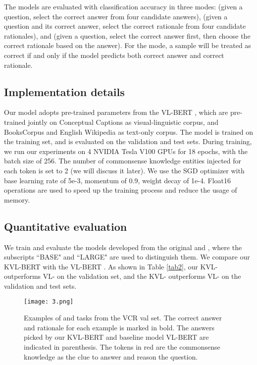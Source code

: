 \documentclass[conference]{IEEEtran}
\begin{document}
The models are evaluated with classification accuracy in three modes:  (given a question, select the correct answer from four candidate answers),  (given a question and its correct answer, select the correct rationale from four candidate rationales), and  (given a question, select the correct answer first, then choose the correct rationale based on the answer). For the  mode, a sample will be treated as correct if and only if the model predicts both correct answer and correct rationale.

\subsection{Implementation details}
Our model adopts pre-trained parameters from the VL-BERT \cite{b14}, which are pre-trained jointly on Conceptual Captions \cite{b41} as visual-linguistic corpus, and BooksCorpus \cite{b42} and English Wikipedia as text-only corpus. The model is trained on the training set, and is evaluated on the validation and test sets. During training, we run our experiments on 4 NVIDIA Tesla V100 GPUs for 18 epochs, with the batch size of 256. The number of commonsense knowledge entities injected for each token is set to 2 (we will discuss it later). We use the SGD optimizer with base learning rate of 5e-3, momentum of 0.9, weight decay of 1e-4. Float16 operations are used to speed up the training process and reduce the usage of memory. 








\subsection{Quantitative evaluation}
We train and evaluate the models developed from the original  and , where the subscripts “BASE" and “LARGE" are used to distinguish them. We compare our KVL-BERT with the VL-BERT  \cite{b14}. As shown in Table \ref{tab2}, our KVL- outperforms VL- on the validation set, and the KVL- outperforms VL- on the validation and test sets.



\begin{figure*}[htp]
  \centering
  \texttt{[image: 3.png]}\\
  \caption{Examples of   and  tasks from the VCR val set. The correct answer and rationale for each example is marked in bold. The answers picked by our KVL-BERT and baseline model VL-BERT are indicated in parenthesis. The tokens in red are the commonsense knowledge as the clue to answer and reason the question.}
  \label{fig_case}
\end{figure*}
\end{document}
